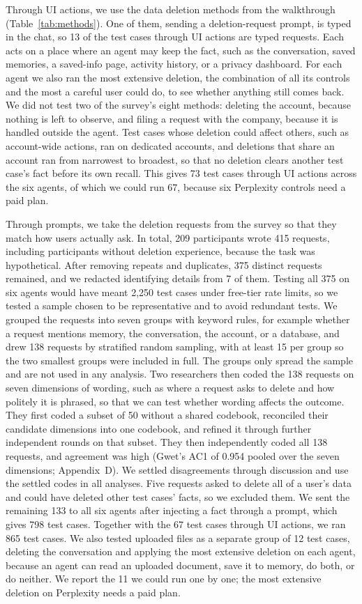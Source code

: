Through UI actions, we use the data deletion methods from the walkthrough (Table~\ref{tab:methods}). One of them, sending a deletion-request prompt, is typed in the chat, so 13 of the test cases through UI actions are typed requests. Each acts on a place where an agent may keep the fact, such as the conversation, saved memories, a saved-info page, activity history, or a privacy dashboard. For each agent we also ran the most extensive deletion, the combination of all its controls and the most a careful user could do, to see whether anything still comes back. We did not test two of the survey's eight methods: deleting the account, because nothing is left to observe, and filing a request with the company, because it is handled outside the agent. Test cases whose deletion could affect others, such as account-wide actions, ran on dedicated accounts, and deletions that share an account ran from narrowest to broadest, so that no deletion clears another test case's fact before its own recall. This gives 73 test cases through UI actions across the six agents, of which we could run 67, because six Perplexity controls need a paid plan.

Through prompts, we take the deletion requests from the survey so that they match how users actually ask. In total, 209 participants wrote 415 requests, including participants without deletion experience, because the task was hypothetical. After removing repeats and duplicates, 375 distinct requests remained, and we redacted identifying details from 7 of them. Testing all 375 on six agents would have meant 2,250 test cases under free-tier rate limits, so we tested a sample chosen to be representative and to avoid redundant tests. We grouped the requests into seven groups with keyword rules, for example whether a request mentions memory, the conversation, the account, or a database, and drew 138 requests by stratified random sampling, with at least 15 per group so the two smallest groups were included in full. The groups only spread the sample and are not used in any analysis. Two researchers then coded the 138 requests on seven dimensions of wording, such as where a request asks to delete and how politely it is phrased, so that we can test whether wording affects the outcome. They first coded a subset of 50 without a shared codebook, reconciled their candidate dimensions into one codebook, and refined it through further independent rounds on that subset. They then independently coded all 138 requests, and agreement was high (Gwet's AC1 of 0.954 pooled over the seven dimensions; Appendix~D). We settled disagreements through discussion and use the settled codes in all analyses. Five requests asked to delete all of a user's data and could have deleted other test cases' facts, so we excluded them. We sent the remaining 133 to all six agents after injecting a fact through a prompt, which gives 798 test cases. Together with the 67 test cases through UI actions, we ran 865 test cases. We also tested uploaded files as a separate group of 12 test cases, deleting the conversation and applying the most extensive deletion on each agent, because an agent can read an uploaded document, save it to memory, do both, or do neither. We report the 11 we could run one by one; the most extensive deletion on Perplexity needs a paid plan.

